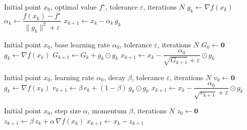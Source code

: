 \documentclass[11pt,a4paper]{article}
\begin{document}
\begin{algorithm}[H]
\caption{Polyak Step Size}
\label{alg:polyak}
\begin{algorithmic}[1]
\Require Initial point $x_0$, optimal value $f^{\star}$, tolerance $\varepsilon$, iterations $N$
    \State $g_k \gets \nabla f(x_k)$
    \State $\alpha_k \gets \dfrac{f(x_k) - f^{\star}}{\|g_k\|^2 + \varepsilon}$
    \State $x_{k+1} \gets x_k - \alpha_k\, g_k$
\EndFor
\end{algorithmic}
\end{algorithm}

\begin{algorithm}[H]
\caption{Adagrad}
\label{alg:adagrad}
\begin{algorithmic}[1]
\Require Initial point $x_0$, base learning rate $\alpha_0$, tolerance $\varepsilon$, iterations $N$
\State $G_0 \gets \mathbf{0}$
    \State $g_k \gets \nabla f(x_k)$
    \State $G_{k+1} \gets G_k + g_k \odot g_k$ 
    \State $x_{k+1} \gets x_k - \dfrac{\alpha_0}{\sqrt{G_{k+1}} + \varepsilon} \odot g_k$
\EndFor
\end{algorithmic}
\end{algorithm}

\begin{algorithm}[H]
\caption{RMSprop}
\label{alg:rmsprop}
\begin{algorithmic}[1]
\Require Initial point $x_0$, learning rate $\alpha_0$, decay $\beta$, tolerance $\varepsilon$, iterations $N$
\State $v_0 \gets \mathbf{0}$
    \State $g_k \gets \nabla f(x_k)$
    \State $v_{k+1} \gets \beta\, v_k + (1 - \beta)\, g_k \odot g_k$ 
    \State $x_{k+1} \gets x_k - \dfrac{\alpha_0}{\sqrt{v_{k+1}} + \varepsilon} \odot g_k$
\EndFor
\end{algorithmic}
\end{algorithm}

\begin{algorithm}[H]
\caption{Polyak Momentum / Heavy Ball}
\label{alg:heavyball}
\begin{algorithmic}[1]
\Require Initial point $x_0$, step size $\alpha$, momentum $\beta$, iterations $N$
\State $z_0 \gets \mathbf{0}$
    \State $z_{k+1} \gets \beta\, z_k + \alpha\, \nabla f(x_k)$
    \State $x_{k+1} \gets x_k - z_{k+1}$
\EndFor
\end{algorithmic}
\end{algorithm}
\end{document}
